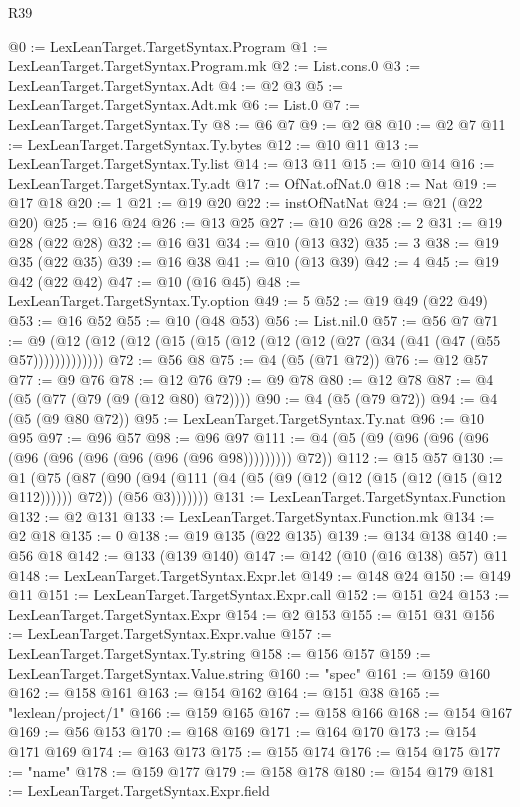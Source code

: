\begin{lexlean}{R39}
\begin{coremodule}
@0 := LexLeanTarget.TargetSyntax.Program
@1 := LexLeanTarget.TargetSyntax.Program.mk
@2 := List.cons.{0}
@3 := LexLeanTarget.TargetSyntax.Adt
@4 := @2 @3
@5 := LexLeanTarget.TargetSyntax.Adt.mk
@6 := List.{0}
@7 := LexLeanTarget.TargetSyntax.Ty
@8 := @6 @7
@9 := @2 @8
@10 := @2 @7
@11 := LexLeanTarget.TargetSyntax.Ty.bytes
@12 := @10 @11
@13 := LexLeanTarget.TargetSyntax.Ty.list
@14 := @13 @11
@15 := @10 @14
@16 := LexLeanTarget.TargetSyntax.Ty.adt
@17 := OfNat.ofNat.{0}
@18 := Nat
@19 := @17 @18
@20 := 1
@21 := @19 @20
@22 := instOfNatNat
@24 := @21 (@22 @20)
@25 := @16 @24
@26 := @13 @25
@27 := @10 @26
@28 := 2
@31 := @19 @28 (@22 @28)
@32 := @16 @31
@34 := @10 (@13 @32)
@35 := 3
@38 := @19 @35 (@22 @35)
@39 := @16 @38
@41 := @10 (@13 @39)
@42 := 4
@45 := @19 @42 (@22 @42)
@47 := @10 (@16 @45)
@48 := LexLeanTarget.TargetSyntax.Ty.option
@49 := 5
@52 := @19 @49 (@22 @49)
@53 := @16 @52
@55 := @10 (@48 @53)
@56 := List.nil.{0}
@57 := @56 @7
@71 := @9 (@12 (@12 (@12 (@15 (@15 (@12 (@12 (@12 (@27 (@34 (@41 (@47 (@55 @57)))))))))))))
@72 := @56 @8
@75 := @4 (@5 (@71 @72))
@76 := @12 @57
@77 := @9 @76
@78 := @12 @76
@79 := @9 @78
@80 := @12 @78
@87 := @4 (@5 (@77 (@79 (@9 (@12 @80) @72))))
@90 := @4 (@5 (@79 @72))
@94 := @4 (@5 (@9 @80 @72))
@95 := LexLeanTarget.TargetSyntax.Ty.nat
@96 := @10 @95
@97 := @96 @57
@98 := @96 @97
@111 := @4 (@5 (@9 (@96 (@96 (@96 (@96 (@96 (@96 (@96 (@96 (@96 @98))))))))) @72))
@112 := @15 @57
@130 := @1
    (@75
      (@87 (@90 (@94 (@111 (@4 (@5 (@9 (@12 (@12 (@15 (@12 (@15 (@12 @112)))))) @72)) (@56 @3)))))))
@131 := LexLeanTarget.TargetSyntax.Function
@132 := @2 @131
@133 := LexLeanTarget.TargetSyntax.Function.mk
@134 := @2 @18
@135 := 0
@138 := @19 @135 (@22 @135)
@139 := @134 @138
@140 := @56 @18
@142 := @133 (@139 @140)
@147 := @142 (@10 (@16 @138) @57) @11
@148 := LexLeanTarget.TargetSyntax.Expr.let
@149 := @148 @24
@150 := @149 @11
@151 := LexLeanTarget.TargetSyntax.Expr.call
@152 := @151 @24
@153 := LexLeanTarget.TargetSyntax.Expr
@154 := @2 @153
@155 := @151 @31
@156 := LexLeanTarget.TargetSyntax.Expr.value
@157 := LexLeanTarget.TargetSyntax.Ty.string
@158 := @156 @157
@159 := LexLeanTarget.TargetSyntax.Value.string
@160 := "spec"
@161 := @159 @160
@162 := @158 @161
@163 := @154 @162
@164 := @151 @38
@165 := "lexlean/project/1"
@166 := @159 @165
@167 := @158 @166
@168 := @154 @167
@169 := @56 @153
@170 := @168 @169
@171 := @164 @170
@173 := @154 @171 @169
@174 := @163 @173
@175 := @155 @174
@176 := @154 @175
@177 := "name"
@178 := @159 @177
@179 := @158 @178
@180 := @154 @179
@181 := LexLeanTarget.TargetSyntax.Expr.field

\end{coremodule}
\end{lexlean}
